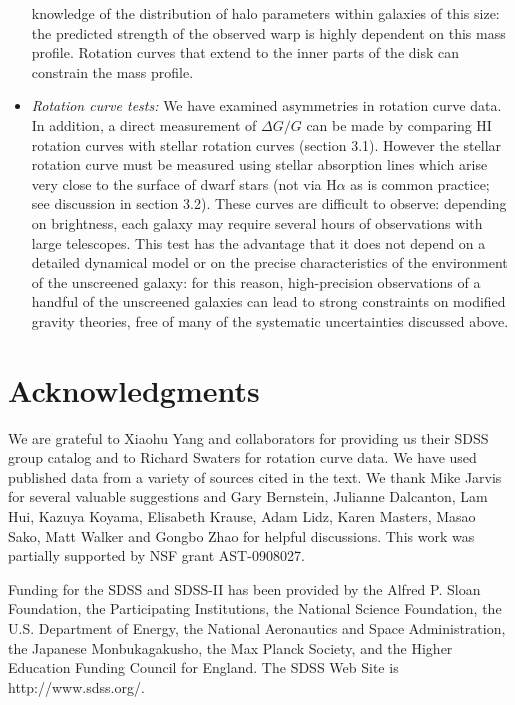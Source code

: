\documentclass[useAMS,usenatbib,twocolumn]{mn2e}
\newcommand{\ha}{H$\alpha$}
\begin{document}
\begin{itemize}
  knowledge of the distribution of halo parameters within galaxies of this
  size: the predicted strength of the observed warp is highly dependent on
  this mass profile. Rotation curves that extend to the inner parts of the disk
can
  constrain the mass profile. 
\item {\it  Rotation curve tests: }
  We have examined asymmetries in rotation curve data. In addition, 
  a direct measurement of $\Delta G/G$ can be made by
  comparing HI rotation curves with stellar rotation curves (section 3.1). However 
  the stellar rotation curve must be measured using stellar absorption
  lines which arise very close to the surface of dwarf stars (not via 
  \ha{} as is common practice; see discussion in section 3.2).  These curves
  are difficult to observe: depending on brightness, each galaxy may require
  several hours of observations with large telescopes. This test
  has the advantage that it does not depend on a detailed dynamical model
  or on the precise characteristics of the environment of the unscreened
  galaxy: for this reason, high-precision observations of
  a handful of the unscreened galaxies can lead to strong constraints on
  modified gravity theories, free of many of the systematic uncertainties
  discussed above.
\end{itemize}


\section{Acknowledgments}
We are grateful to Xiaohu Yang and collaborators 
for providing us their SDSS group catalog and to Richard Swaters for 
rotation curve data. We have used published data from a variety of sources
cited in the text.  
We thank Mike Jarvis for several valuable suggestions and Gary 
Bernstein, Julianne Dalcanton, Lam Hui, Kazuya Koyama, 
Elisabeth Krause, Adam Lidz, Karen Masters, Masao Sako, 
Matt Walker and Gongbo Zhao for helpful
discussions. This work was partially supported by NSF grant AST-0908027.

Funding for the SDSS and SDSS-II has been provided by the Alfred P. Sloan
Foundation, the Participating Institutions, the National Science Foundation,
the U.S. Department of Energy, the National Aeronautics and Space
Administration, the Japanese Monbukagakusho, the Max Planck Society, and the
Higher Education Funding Council for England. The SDSS Web Site is
http://www.sdss.org/.
\end{document}
